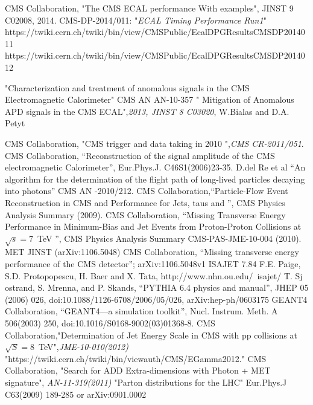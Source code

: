 \begin{thebibliography}{9}
CMS Collaboration, "The CMS ECAL performance With examples", JINST 9 C02008, 2014.
 CMS-DP-2014/011: "\textit{ECAL Timing Performance Run1}"
 https://twiki.cern.ch/twiki/bin/view/CMSPublic/EcalDPGResultsCMSDP2014011
https://twiki.cern.ch/twiki/bin/view/CMSPublic/EcalDPGResultsCMSDP2014012


 "Characterization and treatment of anomalous signals in the CMS Electromagnetic Calorimeter" CMS AN AN-10-357
 " Mitigation of Anomalous APD signals in the CMS ECAL",\textit{2013, JINST 8 C03020}, W.Bialas and D.A. Petyt

CMS Collaboration, "CMS trigger and data taking in 2010 ",\emph{CMS CR-2011/051}.
CMS Collaboration, ``Reconstruction of the signal amplitude of the CMS electromagnetic Calorimeter'', Eur.Phys.J. C46S1(2006)23-35.
 D.del Re et al ``An algorithm for the determination of the flight path of long-lived particles decaying into photons'' CMS AN -2010/212.
CMS Collaboration,``Particle-Flow Event Reconstruction in CMS and Performance for Jets, taus and \ETslash'', CMS Physics Analysis Summary (2009).
CMS Collaboration, “Missing Transverse Energy Performance in Minimum-Bias and Jet Events from Proton-Proton Collisions at $\sqrt{s} =7$~TeV ”, CMS Physics Analysis Summary CMS-PAS-JME-10-004 (2010).
MET JINST (arXiv:1106.5048)
CMS Collaboration, ``Missing transverse energy performance of the CMS detector''; arXiv:1106.5048v1
 ISAJET 7.84 F.E. Paige, S.D. Protopopescu, H. Baer and X. Tata, http://www.nhn.ou.edu/~isajet/
 T. Sj ostrand, S. Mrenna, and P. Skands, “PYTHIA 6.4 physics and manual”, JHEP 05 (2006) 026, doi:10.1088/1126-6708/2006/05/026, arXiv:hep-ph/0603175
 GEANT4 Collaboration, “GEANT4—a simulation toolkit”, Nucl. Instrum. Meth. A 506(2003) 250, doi:10.1016/S0168-9002(03)01368-8.
 CMS Collaboration,"Determination of Jet Energy Scale in CMS with pp collisions at $\sqrt{S} = 8$~TeV",\textit{JME-10-010(2012)}
 "https://twiki.cern.ch/twiki/bin/viewauth/CMS/EGamma2012."
 CMS Collaboration, "Search for ADD Extra-dimensions with Photon + MET signature", \textit{AN-11-319(2011)}
 "Parton distributions for the LHC" Eur.Phys.J C63(2009) 189-285 or arXiv:0901.0002



\end{thebibliography}
